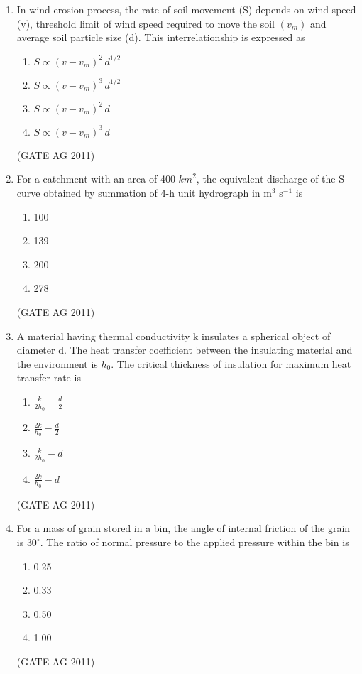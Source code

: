 \documentclass[journal,12pt,onecolumn]{IEEEtran}
\theoremstyle{remark}
\begin{document}
\begin{enumerate}
\item In wind erosion process, the rate of soil movement (S) depends on wind speed (v), 
threshold limit of wind speed required to move the soil $(v_m)$ and average soil particle size (d). 
This interrelationship is expressed as
\begin{multicols}{4}
\begin{enumerate}
\item $S \propto (v - v_m)^2\,d^{1/2}$
\item $S \propto (v - v_m)^3\,d^{1/2}$
\item $S \propto (v - v_m)^2\,d$
\item $S \propto (v - v_m)^3\,d$
\end{enumerate}
\end{multicols}
\hfill{(GATE AG 2011)}

\item For a catchment with an area of 400 ${km}^2$, the equivalent discharge of the S-curve obtained by summation of 4-h unit hydrograph in m$^3$ s$^{-1}$ is
\begin{multicols}{4}
\begin{enumerate}
\item 100
\item 139
\item 200
\item 278
\end{enumerate}
\end{multicols}
\hfill{(GATE AG 2011)}

\item A material having thermal conductivity k insulates a spherical object of diameter d. 
The heat transfer coefficient between the insulating material and the environment is $h_0$. 
The critical thickness of insulation for maximum heat transfer rate is
\begin{multicols}{4}
\begin{enumerate}
\item $\frac{k}{2h_0} - \frac{d}{2}$
\item $\frac{2k}{h_0} - \frac{d}{2}$
\item $\frac{k}{2h_0} - d$
\item $\frac{2k}{h_0} - d$
\end{enumerate}
\end{multicols}
\hfill{(GATE AG 2011)}

\item For a mass of grain stored in a bin, the angle of internal friction of the grain is $30^\circ$. 
The ratio of normal pressure to the applied pressure within the bin is
\begin{multicols}{4}
\begin{enumerate}
\item 0.25
\item 0.33
\item 0.50
\item 1.00
\end{enumerate}
\end{multicols}
\hfill{(GATE AG 2011)}


\end{enumerate}
\end{document}
